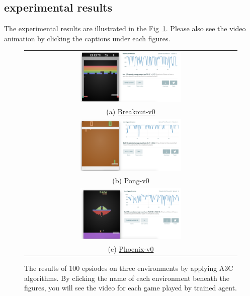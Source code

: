 \subsection{experimental results}
The experimental results are illustrated in the Fig~\ref{fig:A3C_baselines}. Please also
see the video animation by clicking the captions under each figures. 

\begin{figure}[h!]
\label{fig:A3C_baselines}
\centering
\begin{tabular}{c}
\includegraphics[width=0.49\textwidth]{./fig/A3C_Breakout-v0.png} \\
(a) \href{https://gym.openai.com/evaluations/eval_i9E40nAQuOTiSa0bxYBA#reproducibility}{Breakout-v0} \\
\includegraphics[width=0.49\textwidth]{./fig/A3C_Pong-v0.png} \\
(b) \href{https://gym.openai.com/evaluations/eval_mvXuxP13SSacO01UIhsg#reproducibility}{Pong-v0} \\
\includegraphics[width=0.49\textwidth]{./fig/A3C_Phoenix-v0.png} \\
(c) \href{https://gym.openai.com/evaluations/eval_Gva8XrEvTQi63KOd5Gyq1Q#reproducibility}{Phoenix-v0} \\
\end{tabular}
\caption{The results of 100 epsiodes on three environments by applying A3C algorithms. By clicking the name of each environment 
beneath the figures, you will see the video for each game played by trained agent.}
\end{figure}

